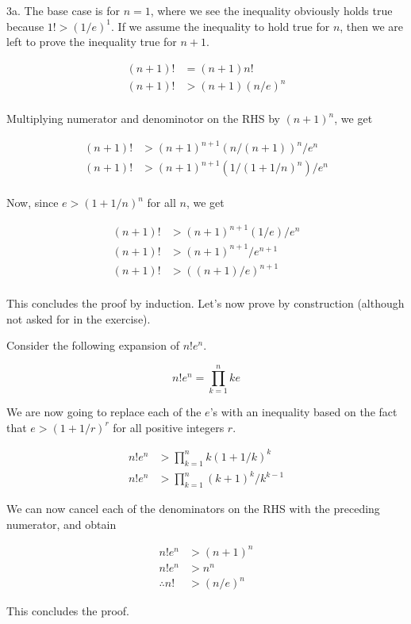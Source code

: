 \documentclass{article}
\begin{document}
3a. The base case is for $n = 1$, where we see the inequality obviously holds true because $1! > (1 / e)^1$. If we assume the inequality to hold true for $n$, then we are left to prove the inequality true for $n + 1$.

\begin{align*}
    (n + 1)! &= (n + 1)n! \\
    (n + 1)! &> (n + 1)(n / e)^n \\
\end{align*}

Multiplying numerator and denominotor on the RHS by $(n + 1)^n$, we get

\begin{align*}
    (n + 1)! &> (n + 1)^{n + 1} (n / (n + 1))^n  / e^n \\
    (n + 1)! &> (n + 1)^{n + 1} (1 / (1 + 1 / n)^n) / e^n \\
\end{align*}

Now, since $e > (1 + 1 / n)^n$ for all $n$, we get

\begin{align*}
    (n + 1)! &> (n + 1)^{n + 1} (1 / e) / e^n \\
    (n + 1)! &> (n + 1)^{n + 1} / e^{n + 1} \\
    (n + 1)! &> ((n + 1) / e)^{n + 1} \\
\end{align*}

This concludes the proof by induction. Let's now prove by construction (although not asked for in the exercise).

Consider the following expansion of $n!e^n$.

\[ n!e^n = \prod_{k=1}^n ke \]

We are now going to replace each of the $e$'s with an inequality based on the fact that $e > (1 + 1 / r)^r$ for all positive integers $r$.

\begin{align*}
    n!e^n &> \prod_{k=1}^n k(1 + 1 /k)^k \\
    n!e^n &> \prod_{k=1}^n (k + 1)^k / k^{k - 1}
\end{align*}

We can now cancel each of the denominators on the RHS with the preceding numerator, and obtain

\begin{align*}
    n!e^n &> (n + 1)^n \\
    n!e^n &> n^n \\
    \therefore n! &> (n / e)^n
\end{align*}

This concludes the proof.
\end{document}
